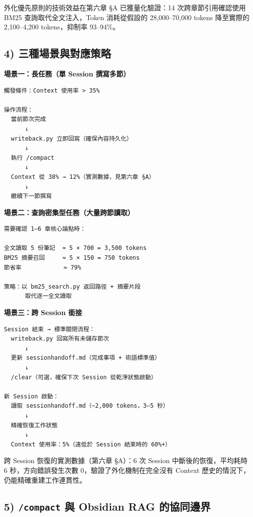 外化優先原則的技術效益在第六章 §A 已獲量化驗證：14 次跨章節引用確認使用
BM25 查詢取代全文注入，Token 消耗從假設的 28,000--70,000 tokens
降至實際的 2,100--4,200 tokens，抑制率 93--94\%。

\subsection{4)
三種場景與對應策略}\label{ux4e09ux7a2eux5834ux666fux8207ux5c0dux61c9ux7b56ux7565}

\textbf{場景一：長任務（單 Session 撰寫多節）}

\begin{verbatim}
觸發條件：Context 使用率 > 35%

操作流程：
  當前節次完成
      ↓
  writeback.py 立即回寫（確保內容持久化）
      ↓
  執行 /compact
      ↓
  Context 從 38% → 12%（實測數據，見第六章 §A）
      ↓
  繼續下一節撰寫
\end{verbatim}

\textbf{場景二：查詢密集型任務（大量跨節讀取）}

\begin{verbatim}
需要確認 1–6 章核心論點時：

全文讀取 5 份筆記  ≈ 5 × 700 = 3,500 tokens
BM25 摘要召回     ≈ 5 × 150 = 750 tokens
節省率            ≈ 79%

策略：以 bm25_search.py 返回路徑 + 摘要片段
      取代逐一全文讀取
\end{verbatim}

\textbf{場景三：跨 Session 銜接}

\begin{verbatim}
Session 結束 → 標準關閉流程：
  writeback.py 回寫所有未儲存節次
      ↓
  更新 sessionhandoff.md（完成事項 + 術語標準值）
      ↓
  /clear（可選，確保下次 Session 從乾淨狀態啟動）

新 Session 啟動：
  讀取 sessionhandoff.md（~2,000 tokens，3–5 秒）
      ↓
  精確恢復工作狀態
      ↓
  Context 使用率：5%（遠低於 Session 結束時的 60%+）
\end{verbatim}

跨 Session 恢復的實測數據（第六章 §A）：6 次 Session
中斷後的恢復，平均耗時 6 秒，方向錯誤發生次數
0，驗證了外化機制在完全沒有 Context
歷史的情況下，仍能精確重建工作連貫性。

\subsection{\texorpdfstring{5) \texttt{/compact} 與 Obsidian RAG
的協同邊界}{5) /compact 與 Obsidian RAG 的協同邊界}}\label{compact-ux8207-obsidian-rag-ux7684ux5354ux540cux908aux754c}


